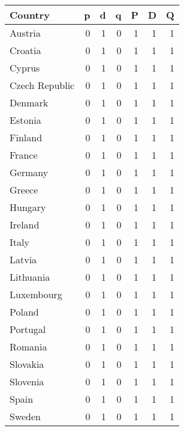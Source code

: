 \begin{tabular}{lrrrrrr}
\toprule
Country & p & d & q & P & D & Q \\
\midrule
Austria & 0 & 1 & 0 & 1 & 1 & 1 \\
Croatia & 0 & 1 & 0 & 1 & 1 & 1 \\
Cyprus & 0 & 1 & 0 & 1 & 1 & 1 \\
Czech Republic & 0 & 1 & 0 & 1 & 1 & 1 \\
Denmark & 0 & 1 & 0 & 1 & 1 & 1 \\
Estonia & 0 & 1 & 0 & 1 & 1 & 1 \\
Finland & 0 & 1 & 0 & 1 & 1 & 1 \\
France & 0 & 1 & 0 & 1 & 1 & 1 \\
Germany & 0 & 1 & 0 & 1 & 1 & 1 \\
Greece & 0 & 1 & 0 & 1 & 1 & 1 \\
Hungary & 0 & 1 & 0 & 1 & 1 & 1 \\
Ireland & 0 & 1 & 0 & 1 & 1 & 1 \\
Italy & 0 & 1 & 0 & 1 & 1 & 1 \\
Latvia & 0 & 1 & 0 & 1 & 1 & 1 \\
Lithuania & 0 & 1 & 0 & 1 & 1 & 1 \\
Luxembourg & 0 & 1 & 0 & 1 & 1 & 1 \\
Poland & 0 & 1 & 0 & 1 & 1 & 1 \\
Portugal & 0 & 1 & 0 & 1 & 1 & 1 \\
Romania & 0 & 1 & 0 & 1 & 1 & 1 \\
Slovakia & 0 & 1 & 0 & 1 & 1 & 1 \\
Slovenia & 0 & 1 & 0 & 1 & 1 & 1 \\
Spain & 0 & 1 & 0 & 1 & 1 & 1 \\
Sweden & 0 & 1 & 0 & 1 & 1 & 1 \\
\bottomrule
\end{tabular}
